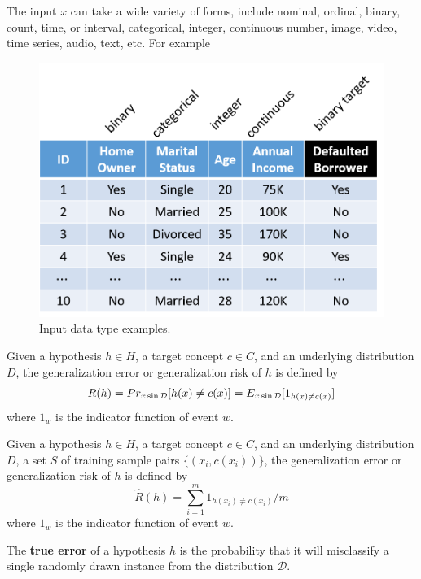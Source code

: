 \begin{refsection}
\begin{itemize}
\end{itemize}

The input $x$ can take a wide variety of forms, include nominal, ordinal, binary, count, time, or interval, categorical, integer, continuous number, image, video, time series, audio, text, etc. For example 
\begin{figure}[H]
	\centering
	\includegraphics[width=0.5\linewidth]{../figures/statisticalLearning/supervisedLearningPrinciples/SupervisedLearningClassificationDataTypeExample}
	\caption{Input data type examples.}
	\label{fig:SupervisedLearningClassificationDataTypeExample}
\end{figure}



\begin{definition}
Given a hypothesis $h\in H$, a target concept $c\in C$, and an underlying distribution $D$, the generalization error or generalization risk of $h$ is defined by
$$R(h) = Pr_{x\sin \mathcal{D}}[h(x)\neq c(x)] = E_{x\sin \mathcal{D}}[1_{h(x)\neq c(x)}]$$
where $1_w$ is the indicator function of event $w$.
\end{definition}


\begin{definition}
Given a hypothesis $h\in H$, a target concept $c\in C$, and an underlying distribution $D$, a set $S$ of training sample pairs $\{(x_i,c(x_i))\}$, the generalization error or generalization risk of $h$ is defined by
$$\hat{R}(h) = \sum_{i=1}^m 1_{h(x_i)\neq c(x_i)}/m$$
where $1_w$ is the indicator function of event $w$.
\end{definition}

\begin{remark}
The \textbf{true error} of a hypothesis $h$ is the probability that it will misclassify a single randomly drawn instance from the distribution $\mathcal{D}$.
\end{remark}


\end{refsection}
